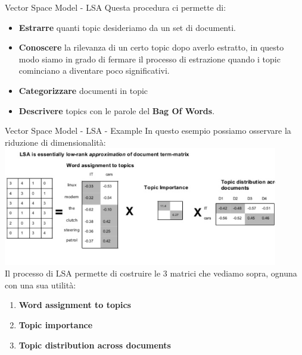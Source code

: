 \documentclass[british]{beamer}
\begin{document}
\begin{frame}{Vector Space Model - LSA}
	Questa procedura ci permette di:
	\begin{itemize}
		\item \textbf{Estrarre} quanti topic desideriamo da un set di documenti.
		\item \textbf{Conoscere} la rilevanza di un certo topic dopo averlo estratto, in questo modo siamo in grado di fermare il processo di estrazione quando i topic cominciano a diventare poco significativi.
		\item \textbf{Categorizzare} documenti in topic
		\item \textbf{Descrivere} topics con le parole del \textbf{Bag Of Words}.
	\end{itemize}
\end{frame}

\begin{frame}{Vector Space Model - LSA - Example}
	In questo esempio possiamo osservare la riduzione di dimensionalit\`{a}:
	\includegraphics[width=0.9\textwidth, height=0.5
	\textheight]{./Imgs/LSA2}\\
	Il processo di LSA permette di costruire le 3 matrici che vediamo sopra, ognuna con una sua utilit\`{a}:
	\begin{enumerate}
		\item \textbf{Word assignment to topics}
		\item \textbf{Topic importance}
		\item \textbf{Topic distribution across documents}
	\end{enumerate}
\end{frame}
\end{document}
